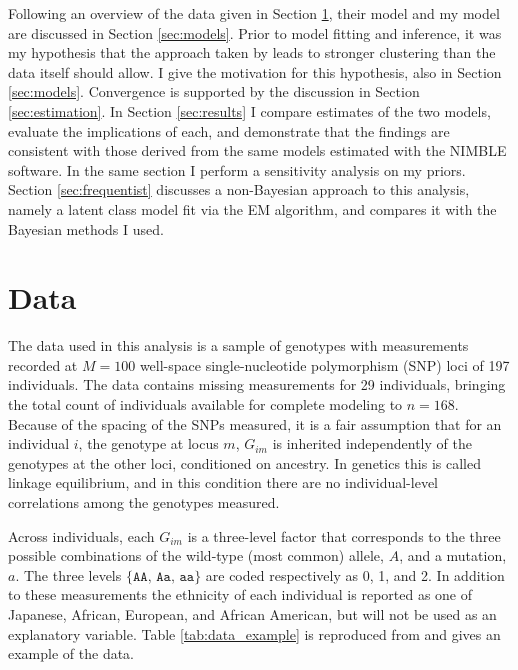 \documentclass{article}
\begin{document}
Following an overview of the data given in Section \ref{sec:data}, their model and my model are discussed in Section \ref{sec:models}. Prior to model fitting and inference, it was my hypothesis that the approach taken by \citeauthor{efron2016CASI} leads to stronger clustering than the data itself should allow. I give the motivation for this hypothesis, also in Section \ref{sec:models}. Convergence is supported by the discussion in Section \ref{sec:estimation}. In Section \ref{sec:results} I compare estimates of the two models, evaluate the implications of each, and demonstrate that the findings are consistent with those derived from the same models estimated with the NIMBLE software. In the same section I perform a sensitivity analysis on my priors. Section \ref{sec:frequentist} discusses a non-Bayesian approach to this analysis, namely a latent class model fit via the EM algorithm, and compares it with the Bayesian methods I used.



\section{Data}\label{sec:data}

The data used in this analysis is a sample of genotypes with measurements recorded at $M=100$ well-space single-nucleotide polymorphism (SNP) loci of 197 individuals. The data contains missing measurements for 29 individuals, bringing the total count of individuals available for complete modeling to $n = 168$. Because of the spacing of the SNPs measured, it is a fair assumption that for an individual $i$, the genotype at locus $m$, $G_{im}$ is inherited independently of the genotypes at the other loci, conditioned on ancestry. In genetics this is called linkage equilibrium, and in this condition there are no individual-level correlations among the genotypes measured.

Across individuals, each $G_{im}$ is a three-level factor that corresponds to the three possible combinations of the wild-type (most common) allele, $A$, and a mutation, $a$. The three levels $\{\texttt{AA, Aa, aa}\}$ are coded respectively as 0, 1, and 2. In addition to these measurements the ethnicity of each individual is reported as one of Japanese, African, European, and African American, but will not be used as an explanatory variable. Table \ref{tab:data_example} is reproduced from \cite{efron2016CASI} and gives an example of the data.
\end{document}
